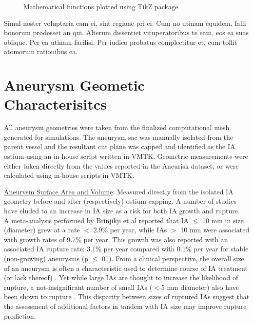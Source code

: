\begin{figure}[htb]
  \begin{center}
  \end{center}
  \caption{Mathematical functions plotted using TikZ package}
  \label{CHAPTER1_FIG02}
\end{figure}

Simul noster voluptaria eam ei, sint regione pri ei. Cum no utinam equidem, 
falli bonorum prodesset an qui. Alterum dissentiet vituperatoribus te eam, 
eos ea suas oblique. Per ea utinam facilisi. \cite{DMOL3_02,HPL_01,HPL_02}
Per iudico probatus complectitur et, cum tollit atomorum rationibus ea.

\section{Aneurysm Geometic Characterisitcs}\label{CHAPTER1_SECTION2}

All aneurysm geometries were taken from the finalized computational mesh generated for simulations. The aneurysm sac was manually isolated from the parent vessel and the resultant cut plane was capped and identified as the IA ostium using an in-house script written in VMTK. Geometric measurements were either taken directly from the values reported in the Aneurisk dataset, or were calculated using in-house scripts in VMTK. 

\underline{Aneurysm Surface Area and Volume}: Measured directly from the isolated IA geometry before and after (respectively) ostium capping. A number of studies have eluded to an increase in IA size as a risk for both IA growth and rupture. \cite{varble2018stroke,brinjikji2015risk,Backes951,greving2014development}. A meta-analysis performed by Brinjikji et al reported that IA $\le$ 10 mm in size (diameter) grew at a rate $<$ 2.9\% per year, while IAs $>$ 10 mm were associated with growth rates of 9.7\% per year. This growth was also reported with an associated IA rupture rate: 3.1\% per year compared with 0.1\% per year for stable (non-growing) aneurysms (p $\le$ 01). From a clinical perspective, the overall size of an aneurysm is often a characteristic used to determine course of IA treatment (or lack thereof) \cite{williams2013management,komotar2008guidelines}. Yet while large IAs are thought to increase the likelihood of rupture, a not-insignificant number of small IAs ($<$5 mm diameter) also have been shown to rupture \cite{kashiwazaki2013size,forget2001review,Korja2014}. This disparity between sizes of ruptured IAs suggest that the assessment of additional factors in tandem with IA size may improve rupture prediction. 

